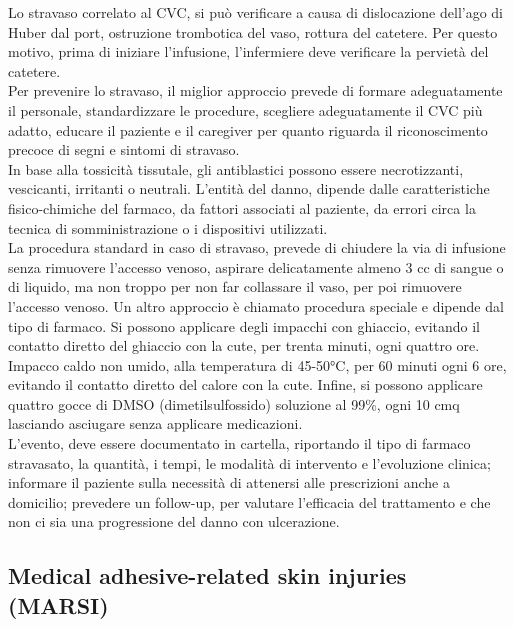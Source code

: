 Lo stravaso correlato al CVC, si può verificare a causa di dislocazione dell’ago di Huber dal port, ostruzione 
trombotica del vaso, rottura del catetere. Per questo motivo, prima di iniziare l’infusione, l’infermiere deve 
verificare la pervietà del catetere.\\
Per prevenire lo stravaso, il miglior approccio prevede di formare adeguatamente il personale, standardizzare le 
procedure, scegliere adeguatamente il CVC più adatto, educare il paziente e il caregiver per quanto riguarda il 
riconoscimento precoce di segni e sintomi di stravaso\cite{AIOMCVC}.\\ 
In base alla tossicità tissutale, gli antiblastici possono essere necrotizzanti, vescicanti, irritanti o neutrali.
L’entità del danno, dipende dalle caratteristiche fisico-chimiche del farmaco, da fattori associati al paziente, 
da errori circa la tecnica di somministrazione o i dispositivi utilizzati\cite{STRAVASOTOSCANA}.\\
La procedura standard in caso di stravaso, prevede di chiudere la via di infusione senza rimuovere l’accesso venoso, 
aspirare delicatamente almeno 3 cc di sangue o di liquido, ma non troppo per non far collassare il vaso, per poi 
rimuovere l’accesso venoso. Un altro approccio è chiamato procedura speciale e dipende dal tipo di farmaco. 
Si possono applicare degli impacchi con ghiaccio, evitando il contatto diretto del ghiaccio con la cute, per trenta 
minuti, ogni quattro ore. Impacco caldo non umido, alla temperatura di 45-50°C, per 60 minuti ogni 6 ore, evitando il 
contatto diretto del calore con la cute. Infine, si possono applicare quattro gocce di DMSO (dimetilsulfossido) 
soluzione al 99\%, ogni 10 cmq lasciando asciugare senza applicare medicazioni\cite{STRAVASOTOSCANA}.\\ 
L'evento, deve essere documentato in cartella, riportando il tipo di farmaco stravasato, la quantità, i tempi, 
le modalità di intervento e l’evoluzione clinica; informare il paziente sulla necessità di attenersi alle 
prescrizioni anche a domicilio; prevedere un follow-up, per valutare l'efficacia del trattamento e che non ci sia una
progressione del danno con ulcerazione\cite{STRAVASOTOSCANA}.

\subsection{Medical adhesive-related skin injuries (MARSI)}

